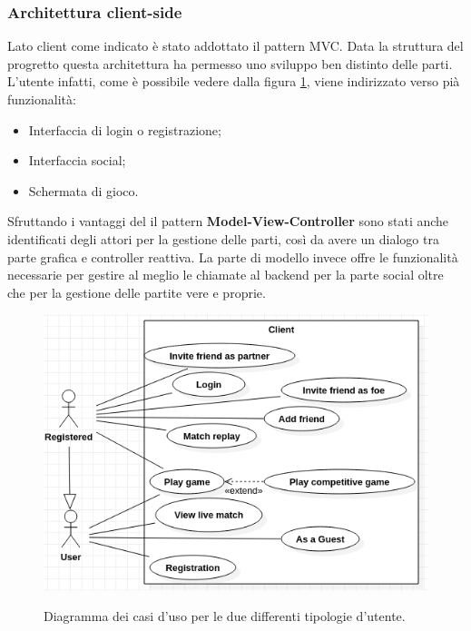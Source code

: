             \subsubsection{Architettura client-side}\label{subsub:architecture:client}
            Lato client come indicato è stato addottato il pattern MVC. Data la struttura del progretto questa architettura ha permesso uno sviluppo ben distinto delle parti.
            \\
            L'utente infatti, come è possibile vedere dalla figura \ref{fig:UserUseCaseDiagram}, viene indirizzato verso pià funzionalità:
            \begin{itemize}
             \item Interfaccia di login o registrazione;
             \item Interfaccia social;
             \item Schermata di gioco.
            \end{itemize}
            Sfruttando i vantaggi del il pattern \textbf{Model-View-Controller} sono stati anche identificati degli attori per la gestione delle parti, così da avere un dialogo tra parte grafica e controller reattiva. 
            La parte di modello invece offre le funzionalità necessarie per gestire al meglio le chiamate al backend per la parte social oltre che per la gestione delle partite vere e proprie.
            
            
	     \begin{figure}[!h]
                \includegraphics[scale=0.7]{image/UserUseCaseDiagram.png}
                \label{fig:UserUseCaseDiagram}
                \caption{Diagramma dei casi d'uso per le due differenti tipologie d'utente.}
            \end{figure}
            
